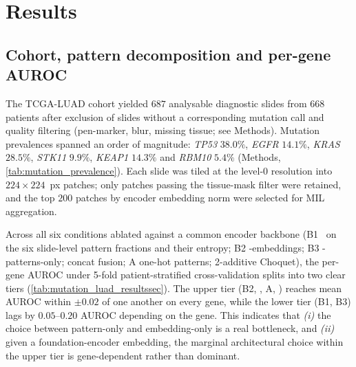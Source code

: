 \section*{Results}

\subsection*{Cohort, pattern decomposition and per-gene AUROC}

The TCGA-LUAD cohort yielded $687$ analysable diagnostic slides from
$668$ patients after exclusion of slides without a corresponding
mutation call and quality filtering (pen-marker, blur, missing
tissue; see Methods).
Mutation prevalences spanned an order of magnitude:
\textit{TP53} $38.0\%$, \textit{EGFR} $14.1\%$, \textit{KRAS}
$28.5\%$, \textit{STK11} $9.9\%$, \textit{KEAP1} $14.3\%$ and
\textit{RBM10} $5.4\%$ (Methods, \cref{tab:mutation_prevalence}).
Each slide was tiled at the level-0 resolution into
$224 \times 224$~px patches; only patches passing the tissue-mask
filter were retained, and the top $200$ patches by encoder
embedding norm were selected for MIL aggregation.

Across all six conditions ablated against a common
\ctranspath{}\cite{wang2022ctranspath} encoder backbone
(B1~\xgb{} on the six slide-level pattern fractions and their
entropy; B2 \abmil{}-embeddings; B3
\abmil{}-patterns-only; \piabmil{} concat fusion; A one-hot
patterns; \fcmil{} 2-additive Choquet),
the per-gene AUROC under 5-fold patient-stratified cross-validation
splits into two clear tiers
(\cref{tab:mutation_luad_resultssec}).
The upper tier (B2, \piabmil{}, A, \fcmil{}) reaches mean AUROC
within $\pm 0.02$ of one another on every gene, while the lower
tier (B1, B3) lags by $0.05$--$0.20$ AUROC depending on the gene.
This indicates that \emph{(i)} the choice between pattern-only and
embedding-only is a real bottleneck, and \emph{(ii)} given a
foundation-encoder embedding, the marginal architectural choice
within the upper tier is gene-dependent rather than dominant.

\begin{table}[htbp]
\centering

\caption{Mutation prediction AUROC (mean $\pm$ SD, 5-fold
patient-stratified CV) on $687$ TCGA-LUAD slides.
B1~$=$~\xgb{} on the $7$-d vector of the six slide-level pattern
fractions and their entropy;
B2~$=$~\abmil{} on \ctranspath{} embeddings (the ceiling baseline);
B3~$=$~\abmil{} on pattern probabilities only;
PI~$=$~\piabmil{} concat fusion (ours);
A~$=$~ablation with one-hot patterns;
FC~$=$~\fcmil{} 2-additive Choquet (ours).
Best per gene in bold.}
\label{tab:mutation_luad_resultssec}
\end{table}

